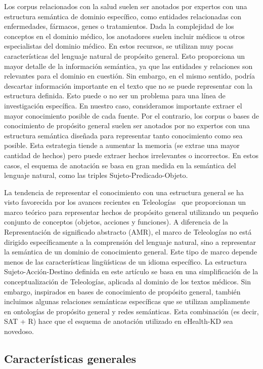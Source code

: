 Los corpus relacionados con la salud suelen ser anotados por expertos con una estructura semántica de dominio específico, como entidades relacionadas con enfermedades, fármacos, genes o tratamientos. Dada la complejidad de los conceptos en el dominio médico, los anotadores suelen incluir médicos u otros especialistas del dominio médico. En estos recursos, se utilizan muy pocas características del lenguaje natural de propósito general. Esto proporciona un mayor detalle de la información semántica, ya que las entidades y relaciones son relevantes para el dominio en cuestión. Sin embargo, en el mismo sentido, podría descartar información importante en el texto que no se puede representar con la estructura definida. Esto puede o no ser un problema para una línea de investigación específica. En nuestro caso, consideramos importante extraer el mayor conocimiento posible de cada fuente. Por el contrario, los corpus o bases de conocimiento de propósito general suelen ser anotados por no expertos con una estructura semántica diseñada para representar tanto conocimiento como sea posible. Esta estrategia tiende a aumentar la memoria (se extrae una mayor cantidad de hechos) pero puede extraer hechos irrelevantes o incorrectos. En estos casos, el esquema de anotación se basa en gran medida en la semántica del lenguaje natural, como las triples Sujeto-Predicado-Objeto.

La tendencia de representar el conocimiento con una estructura general se ha visto favorecida por los avances recientes en Teleologías~\cite{teleologies} que proporcionan un marco teórico para representar hechos de propósito general utilizando un pequeño conjunto de conceptos (objetos, acciones y funciones). A diferencia de la Representación de significado abstracto (AMR), el marco de Teleologías no está dirigido específicamente a la comprensión del lenguaje natural, sino a representar la semántica de un dominio de conocimiento general. Este tipo de marco depende menos de las características lingüísticas de un idioma específico. La estructura Sujeto-Acción-Destino definida en este artículo se basa en una simplificación de la conceptualización de Teleologías, aplicada al dominio de los textos médicos. Sin embargo, inspirados en bases de conocimiento de propósito general, también incluimos algunas relaciones semánticas específicas que se utilizan ampliamente en ontologías de propósito general y redes semánticas. Esta combinación (es decir, SAT + R) hace que el esquema de anotación utilizado en eHealth-KD sea novedoso.

\subsection{Características generales}

